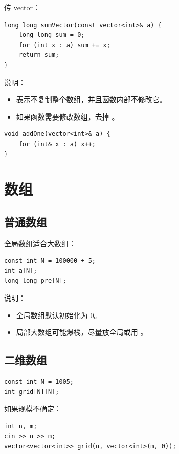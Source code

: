 传 vector：

\begin{lstlisting}
long long sumVector(const vector<int>& a) {
    long long sum = 0;
    for (int x : a) sum += x;
    return sum;
}
\end{lstlisting}

说明：

\begin{itemize}
  \item {} 表示不复制整个数组，并且函数内部不修改它。
  \item 如果函数需要修改数组，去掉 。
\end{itemize}

\begin{lstlisting}
void addOne(vector<int>& a) {
    for (int& x : a) x++;
}
\end{lstlisting}

\section{数组}\label{sec:04-10}

\subsection{普通数组}

全局数组适合大数组：

\begin{lstlisting}
const int N = 100000 + 5;
int a[N];
long long pre[N];
\end{lstlisting}

说明：

\begin{itemize}
  \item 全局数组默认初始化为 0。
  \item 局部大数组可能爆栈，尽量放全局或用 。
\end{itemize}

\subsection{二维数组}

\begin{lstlisting}
const int N = 1005;
int grid[N][N];
\end{lstlisting}

如果规模不确定：

\begin{lstlisting}
int n, m;
cin >> n >> m;
vector<vector<int>> grid(n, vector<int>(m, 0));
\end{lstlisting}

